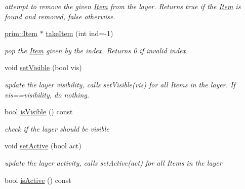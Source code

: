 \begin{DoxyCompactItemize}
\begin{DoxyCompactList}\small\item\em attempt to remove the given \hyperlink{classprim_1_1Item}{Item} from the layer. Returns true if the \hyperlink{classprim_1_1Item}{Item} is found and removed, false otherwise. \end{DoxyCompactList}\item 
\hyperlink{classprim_1_1Item}{prim\+::\+Item} $\ast$ \hyperlink{classprim_1_1Layer_ad8ab05f2dc4eb37b3cb1b58ce465e9d9}{take\+Item} (int ind=-\/1)\hypertarget{classprim_1_1Layer_ad8ab05f2dc4eb37b3cb1b58ce465e9d9}{}\label{classprim_1_1Layer_ad8ab05f2dc4eb37b3cb1b58ce465e9d9}

\begin{DoxyCompactList}\small\item\em pop the \hyperlink{classprim_1_1Item}{Item} given by the index. Returns 0 if invalid index. \end{DoxyCompactList}\item 
void \hyperlink{classprim_1_1Layer_aa9ec922e6147d213b7a391f23e2fe764}{set\+Visible} (bool vis)\hypertarget{classprim_1_1Layer_aa9ec922e6147d213b7a391f23e2fe764}{}\label{classprim_1_1Layer_aa9ec922e6147d213b7a391f23e2fe764}

\begin{DoxyCompactList}\small\item\em update the layer visibility, calls set\+Visible(vis) for all Items in the layer. If vis==visibility, do nothing. \end{DoxyCompactList}\item 
bool \hyperlink{classprim_1_1Layer_a6fff1ee8d18b3d7951277dddffb89257}{is\+Visible} () const \hypertarget{classprim_1_1Layer_a6fff1ee8d18b3d7951277dddffb89257}{}\label{classprim_1_1Layer_a6fff1ee8d18b3d7951277dddffb89257}

\begin{DoxyCompactList}\small\item\em check if the layer should be visible \end{DoxyCompactList}\item 
void \hyperlink{classprim_1_1Layer_af7e5d87a863fa06328ec71473f6a4910}{set\+Active} (bool act)\hypertarget{classprim_1_1Layer_af7e5d87a863fa06328ec71473f6a4910}{}\label{classprim_1_1Layer_af7e5d87a863fa06328ec71473f6a4910}

\begin{DoxyCompactList}\small\item\em update the layer activity, calls set\+Active(act) for all Items in the layer \end{DoxyCompactList}\item 
bool \hyperlink{classprim_1_1Layer_af2e5a5c51de236881c68a7dbfafe4d77}{is\+Active} () const \hypertarget{classprim_1_1Layer_af2e5a5c51de236881c68a7dbfafe4d77}{}\label{classprim_1_1Layer_af2e5a5c51de236881c68a7dbfafe4d77}


\end{DoxyCompactItemize}
